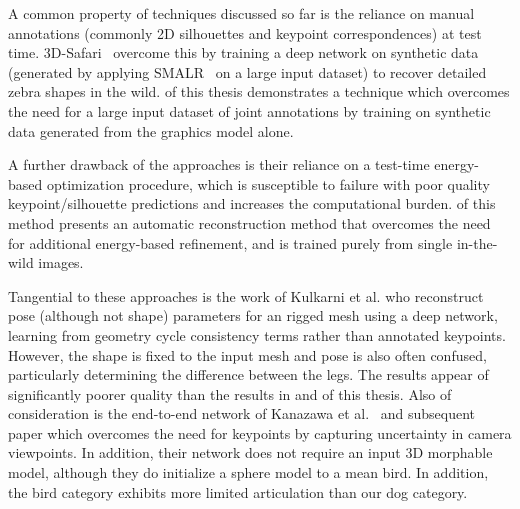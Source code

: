     A common property of techniques discussed so far is the reliance on manual annotations (commonly 2D silhouettes and keypoint correspondences) at test time. 3D-Safari~\cite{Zuffi19Safari} overcome this by training a deep network on synthetic data (generated by applying SMALR~\cite{zuffi_lions} on a large input dataset) to recover detailed zebra shapes in the wild.  of this thesis demonstrates a technique which overcomes the need for a large input dataset of joint annotations by training on synthetic data generated from the graphics model alone. 
    
    A further drawback of the approaches is their reliance on a test-time energy-based optimization procedure, which is susceptible to failure with poor quality keypoint/silhouette predictions and increases the computational burden.  of this method presents an automatic reconstruction method that overcomes the need for additional energy-based refinement, and is trained purely from single in-the-wild images. 
    
    Tangential to these approaches is the work of Kulkarni et al. who reconstruct pose (although not shape) parameters for an rigged mesh using a deep network, learning from geometry cycle consistency terms rather than annotated keypoints. However, the shape is fixed to the input mesh and pose is also often confused, particularly determining the difference between the legs. The results appear of significantly poorer quality than the results in  and  of this thesis. Also of consideration is the end-to-end network of Kanazawa et al.~\cite{kanazawa2018birds} and subsequent paper which overcomes the need for keypoints by capturing uncertainty in camera viewpoints. In addition, their network does not require an input 3D morphable model, although they do initialize a sphere model to a mean bird. In addition, the bird category exhibits more limited articulation than our dog category. 
    

    



